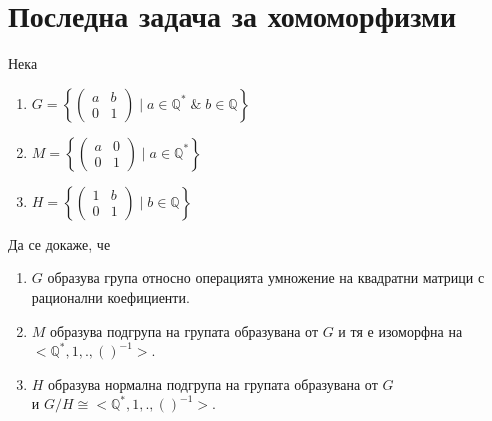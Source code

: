 \documentclass[12pt]{article}
\begin{document}
\section{Последна задача за хомоморфизми}
Нека
\begin{enumerate}
    \item \(G = \left\{\begin{pmatrix}
    a & b \\
    0 & 1
    \end{pmatrix} \; \Big| \; a \in \mathbb{Q}^* \; \& \; b \in \mathbb{Q}\right\}\)
    \item \(M = \left\{\begin{pmatrix}
    a & 0 \\
    0 & 1
    \end{pmatrix} \; \Big| \; a \in \mathbb{Q}^*\right\}\)
    \item \(H = \left\{\begin{pmatrix}
    1 & b \\
    0 & 1
    \end{pmatrix} \; \Big| \; b \in \mathbb{Q}\right\}\)
\end{enumerate}
Да се докаже, че
\begin{enumerate}[label=\alph*)]
    \item \(G\) образува група относно операцията умножение на квадратни матрици с рационални коефициенти.
    \item \(M\) образува подгрупа на групата образувана от \(G\)
    и тя е изоморфна на \(<\mathbb{Q}^*, 1, . , ()^{-1}>\).
    \item \(H\) образува нормална подгрупа на групата образувана от \(G\) \\
    и \(G / H \cong <\mathbb{Q}^*, 1, . , ()^{-1}>\). 
\end{enumerate}
\end{document}
